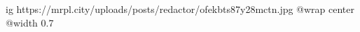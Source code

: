  
 
 
 
 

\ifcmt
  ig https://mrpl.city/uploads/posts/redactor/ofekbts87y28mctn.jpg
  @wrap center
  @width 0.7
\fi
